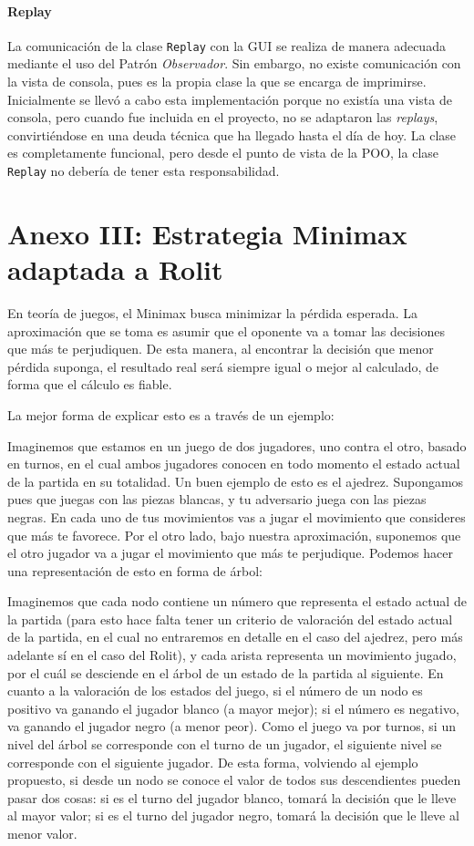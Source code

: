 \documentclass[12pt,a4paper,openright]{book}
\theoremstyle{break}
\begin{document}
\subsubsection{Replay}
La comunicación de la clase \texttt{Replay} con la GUI se realiza de manera adecuada mediante el uso del Patrón \textit{Observador}. Sin embargo, no existe comunicación con la vista de consola, pues es la propia clase la que se encarga de imprimirse. Inicialmente se llevó a cabo esta implementación porque no existía una vista de consola, pero cuando fue incluida en el proyecto, no se adaptaron las \textit{replays}, convirtiéndose en una deuda técnica que ha llegado hasta el día de hoy. La clase es completamente funcional, pero desde el punto de vista de la POO, la clase \texttt{Replay} no debería de tener esta responsabilidad.

\chapter{Anexo III: Estrategia Minimax adaptada a Rolit}
\label{ch:AnexoIII}

En teoría de juegos, el Minimax busca minimizar la pérdida esperada. La aproximación que se toma es asumir que el oponente va a tomar las decisiones que más te perjudiquen. De esta manera, al encontrar la decisión que menor pérdida suponga, el resultado real será siempre igual o mejor al calculado, de forma que el cálculo es fiable.

La mejor forma de explicar esto es a través de un ejemplo:

Imaginemos que estamos en un juego de dos jugadores, uno contra el otro, basado en turnos, en el cual ambos jugadores conocen en todo momento el estado actual de la partida en su totalidad. Un buen ejemplo de esto es el ajedrez. Supongamos pues que juegas con las piezas blancas, y tu adversario juega con las piezas negras. En cada uno de tus movimientos vas a jugar el movimiento que consideres que más te favorece. Por el otro lado, bajo nuestra aproximación, suponemos que el otro jugador va a jugar el movimiento que más te perjudique. Podemos hacer una representación de esto en forma de árbol:

Imaginemos que cada nodo contiene un número que representa el estado actual de la partida (para esto hace falta tener un criterio de valoración del estado actual de la partida, en el cual no entraremos en detalle en el caso del ajedrez, pero más adelante sí en el caso del Rolit), y cada arista representa un movimiento jugado, por el cuál se desciende en el árbol de un estado de la partida al siguiente. En cuanto a la valoración de los estados del juego, si el número de un nodo es positivo va ganando el jugador blanco (a mayor mejor); si el número es negativo, va ganando el jugador negro (a menor peor). Como el juego va por turnos, si un nivel del árbol se corresponde con el turno de un jugador, el siguiente nivel se corresponde con el siguiente jugador. De esta forma, volviendo al ejemplo propuesto, si desde un nodo se conoce el valor de todos sus descendientes pueden pasar dos cosas: si es el turno del jugador blanco, tomará la decisión que le lleve al mayor valor; si es el turno del jugador negro, tomará la decisión que le lleve al menor valor. 
\end{document}
